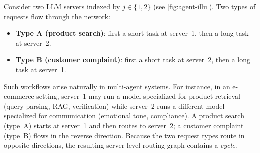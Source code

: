 \documentclass[11pt]{article}
\theoremstyle{plain}
\theoremstyle{definition}
\theoremstyle{remark}
\begin{document}
Consider two LLM servers indexed by $j \in \{1, 2\}$ (see \cref{fig:agent-illu}). Two types of requests flow through the network:
\begin{itemize}
    \item \textbf{Type A (product search)}: first a short task at server~1, then a long task at server~2.
    \item \textbf{Type B (customer complaint)}: first a short task at server~2, then a long task at server~1.
\end{itemize}
Such workflows arise naturally in multi-agent systems. For instance, in an e-commerce setting, server~1 may run a model specialized for product retrieval (query parsing, RAG, verification) while server~2 runs a different model specialized for communication (emotional tone, compliance). A product search (type~A) starts at server~1 and then routes to server~2; a customer complaint (type~B) flows in the reverse direction. Because the two request types route in opposite directions, the resulting server-level routing graph contains a \emph{cycle}.
\end{document}
